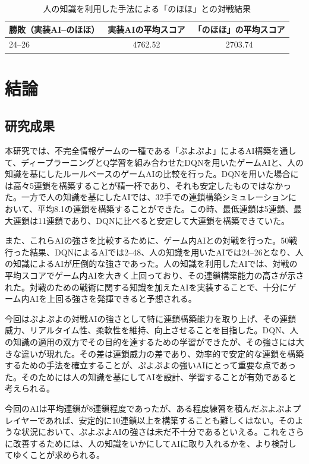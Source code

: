 \documentclass[12pt]{jreport}
\begin{document}
\begin{table}[tbp]
\begin{center}
\caption{人の知識を利用した手法による「のほほ」との対戦結果} \label{tab:human_vs}
  \begin{tabular}{|l|c|c|} \hline
勝敗（実装AI--のほほ） & 実装AIの平均スコア & 「のほほ」の平均スコア\\ \hline
 24--26 & 4762.52 & 2703.74\\ \hline
\end{tabular}
\end{center}
\end{table}


\chapter{結論} \label{ketu} \setcounter{section}{0}
\section{研究成果}
本研究では、不完全情報ゲームの一種である「ぷよぷよ」によるAI構築を通して、ディープラーニングとQ学習を組み合わせたDQNを用いたゲームAIと、人の知識を基にしたルールベースのゲームAIの比較を行った。DQNを用いた場合には高々5連鎖を構築することが精一杯であり、それも安定したものではなかった。一方で人の知識を基にしたAIでは、32手での連鎖構築シミュレーションにおいて、平均8.1の連鎖を構築することができた。この時、最低連鎖は5連鎖、最大連鎖は11連鎖であり、DQNに比べると安定して大連鎖を構築できていた。

また、これらAIの強さを比較するために、ゲーム内AIとの対戦を行った。50戦行った結果、DQNによるAIでは2--48、人の知識を用いたAIでは24--26となり、人の知識によるAIが圧倒的な強さであった。人の知識を利用したAIでは、対戦の平均スコアでゲーム内AIを大きく上回っており、その連鎖構築能力の高さが示された。対戦のための戦術に関する知識を加えたAIを実装することで、十分にゲーム内AIを上回る強さを発揮できると予想される。

今回はぷよぷよの対戦AIの強さとして特に連鎖構築能力を取り上げ、その連鎖威力、リアルタイム性、柔軟性を維持、向上させることを目指した。DQN、人の知識の適用の双方でその目的を達するための学習ができたが、その強さには大きな違いが現れた。その差は連鎖威力の差であり、効率的で安定的な連鎖を構築するための手法を確立することが、ぷよぷよの強いAIにとって重要な点であった。そのためには人の知識を基にしてAIを設計、学習することが有効であると考えられる。

今回のAIは平均連鎖が8連鎖程度であったが、ある程度練習を積んだぷよぷよプレイヤーであれば、安定的に10連鎖以上を構築することも難しくはない。そのような状況において、ぷよぷよAIの強さは未だ不十分であるといえる。これをさらに改善するためには、人の知識をいかにしてAIに取り入れるかを、より検討してゆくことが求められる。
\end{document}
